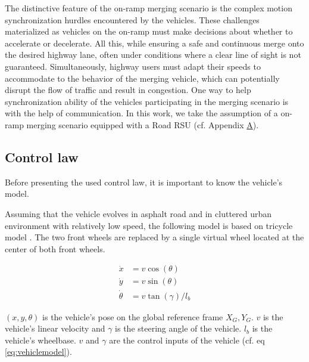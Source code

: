 The distinctive feature of the on-ramp merging scenario is the complex motion synchronization hurdles encountered by the vehicles. These challenges materialized as vehicles on the on-ramp must make decisions about whether to accelerate or decelerate. All this, while ensuring a safe and continuous merge onto the desired highway lane, often under conditions where a clear line of sight is not guaranteed. Simultaneously, highway users must adapt their speeds to accommodate to the behavior of the merging vehicle, which can potentially disrupt the flow of traffic and result in congestion. One way to help synchronization ability of the vehicles participating in the merging scenario is with the help of communication. In this work, we take the assumption of a on-ramp merging scenario equipped with a Road RSU (cf. Appendix \hyperlink{AppendixA}{A}).  


\subsection{Control law } \label{sec:control_law}

Before presenting the used control law, it is important to know the vehicle's model. 



Assuming that the vehicle evolves in asphalt road and in cluttered urban environment with relatively low speed, the following model is based on tricycle model \cite{ventura2015safe}. The two front wheels are replaced by a single virtual wheel located at the center of both front wheels. 


\begin{equation} \label{eq:vehiclemodel}
\begin{aligned}
\dot{x} &=v \cos (\theta) \\
\dot{y} &=v \sin (\theta) \\
\dot{\theta} &=v \tan (\gamma) / l_{b}
\end{aligned}
\end{equation}

\noindent $(x,y,\theta)$ is the vehicle's pose on the global reference frame $X_{G},Y_{G}$. $v$ is the vehicle's linear velocity and $\gamma$ is the steering angle of the vehicle. $l_{b}$ is the vehicle's wheelbase. $v$ and $\gamma$ are the control inputs of the vehicle (cf. eq \ref{eq:vehiclemodel}). 




